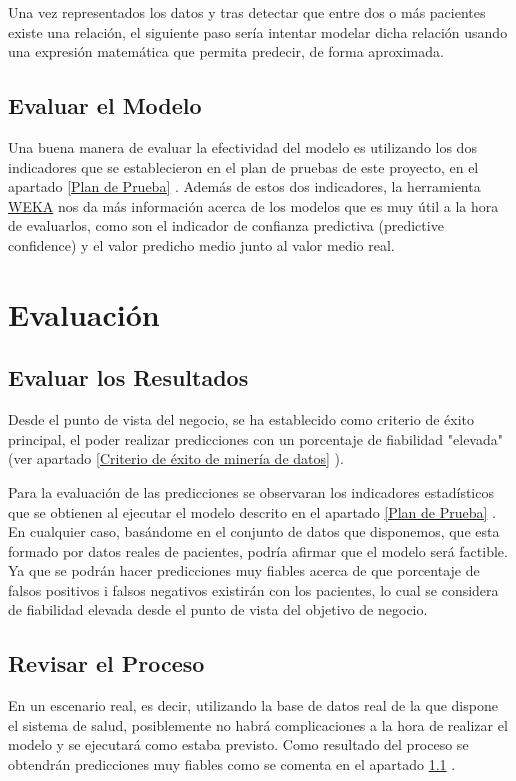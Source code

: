 \documentclass{article}
\begin{document}
Una vez representados los datos y tras detectar que entre dos o más pacientes existe una relación, el siguiente paso sería intentar modelar dicha relación usando una expresión matemática que permita predecir, de forma aproximada. 

\subsection{Evaluar el Modelo}
Una buena manera de evaluar la efectividad del modelo es utilizando los dos indicadores que se establecieron en el plan de pruebas de este proyecto, en el apartado \ref{Plan de Prueba} . Además de estos dos indicadores, la herramienta \href{https://www.cs.waikato.ac.nz/~ml/weka/}{WEKA} nos da más información acerca de los modelos que es muy útil a la hora de evaluarlos, como son el indicador de confianza predictiva (predictive confidence) y el valor predicho medio junto al valor medio real.

\section{Evaluación}

\subsection{Evaluar los Resultados}\label{Evaluar los Resultados}
Desde el punto de vista del negocio, se ha establecido como criterio de éxito principal, el poder realizar predicciones con un porcentaje de fiabilidad "elevada" (ver apartado \ref{Criterio de éxito de minería de datos} ).

Para la evaluación de las predicciones se observaran los indicadores estadísticos que se obtienen al ejecutar el modelo descrito en el apartado \ref{Plan de Prueba} . En cualquier caso, basándome en el conjunto de datos que disponemos, que esta formado por datos reales de pacientes, podría afirmar que el modelo será factible. Ya que se podrán hacer predicciones muy fiables acerca de que porcentaje de falsos positivos i falsos negativos existirán con los pacientes, lo cual se considera de fiabilidad elevada desde el punto de vista del objetivo de negocio.

\subsection{Revisar el Proceso}
En un escenario real, es decir, utilizando la base de datos real de la que dispone el sistema de salud, posiblemente no habrá complicaciones a la hora de realizar el modelo y se ejecutará como estaba previsto. Como resultado del proceso se obtendrán predicciones muy fiables como se comenta en el apartado \ref{Evaluar los Resultados} .
\end{document}
